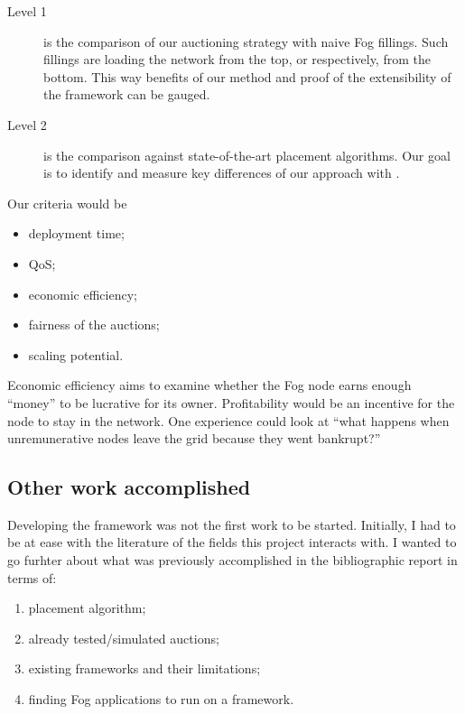 \begin{description}
	\item[Level 1]{is the comparison of our auctioning strategy with naive Fog fillings. Such fillings are loading the network from the top, or respectively, from the bottom. This way benefits of our method and proof of the extensibility of the framework can be gauged.}
	\item[Level 2]{is the comparison against state-of-the-art placement algorithms. Our goal is to identify and measure key differences of our approach with \cite{tasiopoulos_fogspot_2019, bermbach_auctionwhisk_2021}.}
\end{description}

Our criteria would be
\begin{itemize}
	\item deployment time;
	\item \gls{QoS};
	\item economic efficiency;
	\item fairness of the auctions;
	\item scaling potential.
\end{itemize}

Economic efficiency aims to examine whether the Fog node earns enough “money” to be lucrative for its owner. Profitability would be an incentive for the node to stay in the network. One experience could look at “what happens when unremunerative nodes leave the grid because they went bankrupt?”

\subsection{Other work accomplished}

Developing the framework was not the first work to be started. Initially, I had to be at ease with the literature of the fields this project interacts with. I wanted to go furhter about what was previously accomplished in the bibliographic report in terms of:
\begin{enumerate}
	\item placement algorithm;\label{enumerate:placement}
	\item already tested/simulated auctions;\label{enumerate:alreadytested}
	\item existing frameworks and their limitations;\label{enumerate:frameworklimitations}
	\item finding Fog applications to run on a framework.\label{enumerate:fogapplications}
\end{enumerate}

